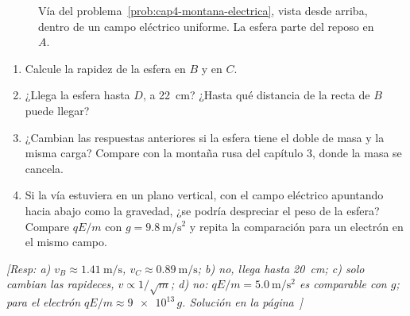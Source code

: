 \documentclass[11pt,a4paper]{book}
\begin{document}
\begin{enumerate}
    \begin{figure}[htbp]
        \centering
        \caption{Vía del problema~\ref{prob:cap4-montana-electrica}, vista desde arriba, dentro de un campo eléctrico uniforme. La esfera parte del reposo en $A$.}
        \label{fig:cap4-montana-electrica}
    \end{figure}

    \begin{enumerate}
        \item Calcule la rapidez de la esfera en $B$ y en $C$.
        \item ¿Llega la esfera hasta $D$, a \SI{22}{\centi\meter}? ¿Hasta qué distancia de la recta de $B$ puede llegar?
        \item ¿Cambian las respuestas anteriores si la esfera tiene el doble de masa y la misma carga? Compare con la montaña rusa del capítulo 3, donde la masa se cancela.
        \item Si la vía estuviera en un plano vertical, con el campo eléctrico apuntando hacia abajo como la gravedad, ¿se podría despreciar el peso de la esfera? Compare $qE/m$ con $g = \SI{9.8}{\meter\per\second\squared}$ y repita la comparación para un electrón en el mismo campo.
    \end{enumerate}
    \textit{[Resp: a) $v_B \approx \SI{1.41}{\meter\per\second}$, $v_C \approx \SI{0.89}{\meter\per\second}$; b) no, llega hasta \SI{20}{\centi\meter}; c) solo cambian las rapideces, $v \propto 1/\sqrt{m}$; d) no: $qE/m = \SI{5.0}{\meter\per\second\squared}$ es comparable con $g$; para el electrón $qE/m \approx \num{9e13}\,g$. Solución en la página~\pageref{sol:cap4-montana-electrica}]}

\end{enumerate}
\end{document}
